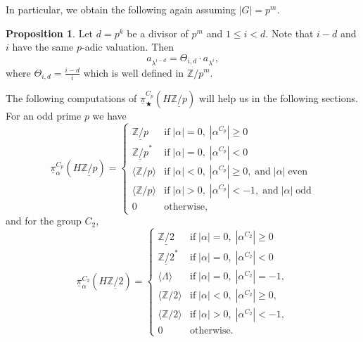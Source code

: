 \documentclass[a4paper,leqno,11pt]{amsart}
\theoremstyle{plain}
\theoremstyle{definition}
\newtheorem{prop}[theorem]{Proposition}
\theoremstyle{remark}
\theoremstyle{definition}
\newcommand{\Z}{{\mathbb{Z}}}
\newcommand{\upi}{\underline{\pi}}
\newenvironment{myeq}[1][]
{\stepcounter{theorem}\begin{equation}\tag{\thetheorem}{#1}}
	{\end{equation}}
\def\Z{\mathbb{Z}}
\numberwithin{equation}{section}
\newcommand{\Zp}{\underline{{\mathbb Z}/p}}
\newcommand{\Zt}{\underline{{\mathbb Z}/2}}
\begin{document}
In particular, we obtain the following again assuming $|G|=p^m$.
	\begin{prop}\label{prop:rel betw a lambda}
		Let $ d =p^k$ be a divisor of $ p^m $ and $ 1\le i<d $.	 Note that $ i-d $ and $ i $ have the same $ p $-adic valuation. Then 
		\[
		a_{\lambda^{i-d}}=\Theta_{i,d} \cdot a_{\lambda^i},
		\]
		where   $\Theta_{i,d}=\frac{i-d}{i}$ which is well defined in $ \Z/p^m $. 
	\end{prop}
	The following computations of $\upi_\bigstar^{C_p}(H\Zp)$ \cite[Appendix B]{Ferland-thesis}	 will help us in the following sections. For an odd prime  $ p $ we have
	\begin{myeq}\label{cp-comp zp cof}
		\upi_{\alpha}^{C_p}(H \Zp) = \begin{cases} \Zp & \text{if} \; |\alpha| =0, \; |\alpha^{C_p}| \geq 0 \\
			\Zp^* & \text{if} \; |\alpha| =0, \; |\alpha^{C_p}| < 0 \\
			\langle \Z/p \rangle & \text{if}\;  |\alpha| <0, \; |\alpha^{C_p}| \geq 0, \; \text{and} \; |\alpha| \; \text{even} \\ 
			\langle \Z/p \rangle & \text{if} \;|\alpha|>0, \; |\alpha^{C_p}| <-1,\; \text{and} \; |\alpha| \; \text{odd} \\ 
			0 & \text{otherwise,} \end{cases}
	\end{myeq}
and	for the group $ C_2 $, 
	\begin{myeq}\label{cp-comp z2 cof}
		\upi_{\alpha}^{C_2}(H \Zt) = \begin{cases} \Zt & \text{if} \; |\alpha| =0, \; |\alpha^{C_2}| \geq 0 \\
			\Zt^* & \text{if} \; |\alpha| =0, \; |\alpha^{C_2}| < 0 \\
			\langle  \Lambda  \rangle & \text{if} \;|\alpha|=0, \; |\alpha^{C_2}| =-1, \\ 
			\langle \Z/2 \rangle & \text{if}\;  |\alpha| <0, \; |\alpha^{C_2}| \geq 0, \\ 
			\langle \Z/2 \rangle & \text{if} \;|\alpha|>0, \; |\alpha^{C_2}| <-1, \\ 
			0 & \text{otherwise.} \end{cases}
	\end{myeq}
	
\end{document}
